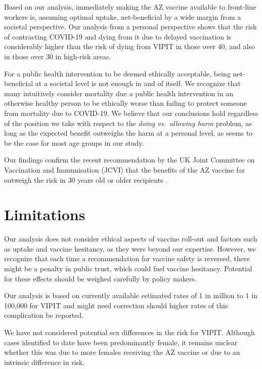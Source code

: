 \documentclass[]{interact}
\theoremstyle{plain}%
\theoremstyle{definition}
\theoremstyle{remark}
\begin{document}
Based on our analysis, immediately making the AZ vaccine available to
front-line workers is, assuming optimal uptake, net-beneficial by a wide
margin from a societal perspective. Our analysis from a personal
perspective shows that the risk of contracting COVID-19 and dying from
it due to delayed vaccination is considerably higher than the risk of
dying from VIPIT in those over 40, and also in those over 30 in
high-risk areas.

For a public health intervention to be deemed ethically acceptable,
being net-beneficial at a societal level is not enough in and of itself.
We recognize that many intuitively consider mortality due a public
health intervention in an otherwise healthy person to be ethically worse
than failing to protect someone from mortality due to COVID-19. We
believe that our conclusions hold regardless of the position we take
with respect to the \emph{doing vs.~allowing harm}
problem\citep{woollard_doing_2016}, as long as the expected benefit
outweighs the harm at a personal level, as seems to be the case for most
age groups in our study.

Our findings confirm the recent recommendation by the UK Joint Committee
on Vaccination and Immunisation (JCVI) that the benefits of the AZ
vaccine far outweigh the risk in 30 years old or older recipients
\citep{jcvi_jcvi_2021}.

\hypertarget{limitations}{%
\section{Limitations}\label{limitations}}

Our analysis does not consider ethical aspects of vaccine roll-out and
factors such as uptake and vaccine hesitancy, as they were beyond our
expertise. However, we recognize that each time a recommendation for
vaccine safety is reversed, there might be a penalty in public trust,
which could fuel vaccine hesitancy. Potential for these effects should
be weighed carefully by policy makers.

Our analysis is based on currently available estimated rates of 1 in
million to 1 in 100,000 for VIPIT and might need correction should
higher rates of this complication be reported.

We have not considered potential sex differences in the risk for VIPIT.
Although cases identified to date have been predominantly female, it
remains unclear whether this was due to more females receiving the AZ
vaccine or due to an intrinsic difference in risk.
\end{document}
